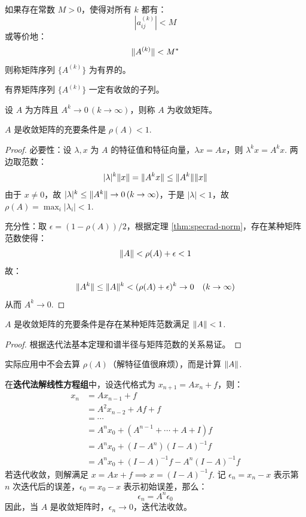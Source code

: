 \begin{definition}[有界]
如果存在常数 $M>0$，使得对所有 $k$ 都有：
\[
    |a_{ij}^{(k)}|<M
\]
或等价地：
\[
    \Vert A^{(k)}\Vert<M^\ast
\]
则称矩阵序列 $\{A^{(k)}\}$ 为有界的。
\end{definition}

\begin{theorem}
有界矩阵序列 $\{A^{(k)}\}$ 一定有收敛的子列。
\end{theorem}

\begin{definition}[收敛矩阵]
设 $A$ 为方阵且 $A^k\to 0\,(k\to\infty)$，则称 $A$ 为收敛矩阵。
\end{definition}

\begin{theorem}[迭代法基本定理]
\label{thm:iterbase}
$A$ 是收敛矩阵的充要条件是 $\rho(A)<1$.
\end{theorem}
\begin{proof}
必要性：设 $\lambda,x$ 为 $A$ 的特征值和特征向量，$\lambda x=Ax$，则 $\lambda^kx=A^kx$.  两边取范数：
\[
    |\lambda|^k\Vert x\Vert=\Vert A^kx\Vert\leq\Vert A^k\Vert\Vert x\Vert	
\]
由于 $x\neq 0$，故 $|\lambda|^k\leq\Vert A^k\Vert\to0\,(k\to\infty)$，于是 $|\lambda|<1$，故 $\rho(A)=\max_i|\lambda_i|<1$.

充分性：取 $\epsilon=(1-\rho(A))/2$，根据定理 \ref{thm:specrad-norm}，存在某种矩阵范数使得：
\[
    \Vert A\Vert<\rho(A)+\epsilon<1
\]
故：
\[
    \Vert A^k\Vert\leq\Vert A\Vert^k<(\rho(A)+\epsilon)^k\to 0\quad(k\to\infty)
\]
从而 $A^k\to0$.
\end{proof}

\begin{theorem}
$A$ 是收敛矩阵的充要条件是存在某种矩阵范数满足 $\Vert A\Vert<1$.
\end{theorem}
\begin{proof}
根据迭代法基本定理和谱半径与矩阵范数的关系易证。
\end{proof}

\begin{remark}
实际应用中不会去算 $\rho(A)$（解特征值很麻烦），而是计算 $\Vert A\Vert$.
\end{remark}

\begin{example}
在\textbf{迭代法解线性方程组}中，设迭代格式为 $x_{n+1}=Ax_n+f$，则：
\begin{align*}
    x_{n}&=Ax_{n-1}+f\\
    &=A^2x_{n-2}+Af+f\\
    &=\cdots\\
    &=A^n x_0+(A^{n-1}+\cdots+A+I)f\\
    &=A^n x_0+(I-A^n)(I-A)^{-1}f\\
    &=A^nx_0+(I-A)^{-1}f-A^n(I-A)^{-1}f
\end{align*}
若迭代收敛，则解满足 $x=Ax+f\implies x=(I-A)^{-1}f$.  记 $\epsilon_n=x_n-x$ 表示第 $n$ 次迭代后的误差，$\epsilon_0=x_0-x$ 表示初始误差，那么：
\[
\epsilon_n=A^n\epsilon_0
\]
因此，当 $A$ 是收敛矩阵时，$\epsilon_n\to0$，迭代法收敛。
\end{example}

